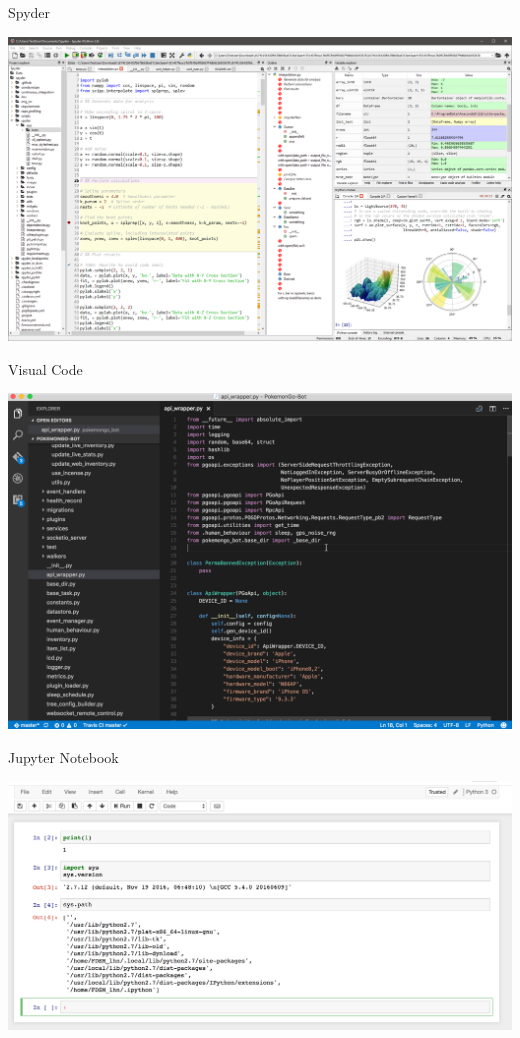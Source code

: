 \documentclass{beamer}
\begin{document}
\begin{frame}{Spyder}
 \begin{center}
  \includegraphics[scale=0.2]{./figures/spyder.png}
 \end{center}
\end{frame}

\begin{frame}{Visual Code}
 \begin{center}
  \includegraphics[scale=0.4]{./figures/vscode.png}
 \end{center}
\end{frame}

\begin{frame}{Jupyter Notebook}
 \begin{center}
  \includegraphics[scale=0.4]{./figures/jupyter.png}
 \end{center}
\end{frame}
\end{document}
